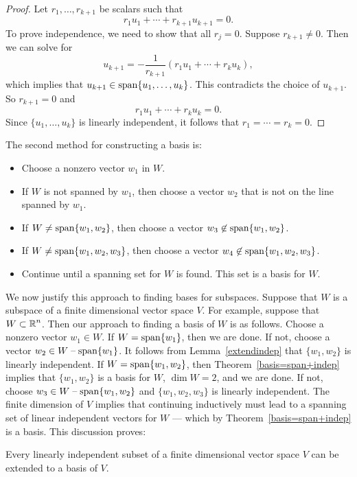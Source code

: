 \documentclass{ximera}
\begin{document}
\begin{proof}  Let $r_1,\ldots,r_{k+1}$ be scalars such that
\begin{equation}  \label{rk+1}
r_1u_1 + \cdots + r_{k+1}u_{k+1} = 0.
\end{equation}
To prove independence, we need to show that all $r_j=0$.
Suppose $r_{k+1}\neq 0$.  Then we can solve  for
\[
u_{k+1} = -\frac{1}{r_{k+1}}(r_1u_1+\cdots +r_ku_k),
\]
which implies that $u_{k+1}\in {\rm span}\{u_1,\ldots,u_k\}$.  This
contradicts the choice of $u_{k+1}$.  So $r_{k+1}=0$ and
\[
r_1u_1 + \cdots + r_ku_k = 0.
\]
Since $\{u_1,\ldots,u_k\}$ is linearly independent, it follows
that $r_1=\cdots =r_k=0$.  \end{proof}

The second method for constructing a basis is:
\begin{itemize}
\item        Choose a nonzero vector $w_1$ in $W$.
\item If $W$ is not spanned by $w_1$, then choose a vector $w_2$
that is not on the line spanned by $w_1$.
\item        If $W\neq{\rm span}\{w_1,w_2\}$, then choose a vector
$w_3\not\in
{\rm span}\{w_1,w_2\}$.
\item        If $W\neq{\rm span}\{w_1,w_2,w_3\}$, then choose a vector
$w_4\not\in
{\rm span}\{w_1,w_2,w_3\}$.
\item Continue until a spanning set for $W$ is
found.  This set is a basis for $W$.
\end{itemize}

We now justify this approach to finding bases for subspaces.
Suppose that $W$ is a subspace of a finite dimensional vector
space $V$.  For example, suppose that $W\subset\mbox{$\Bbb{R}$}^n$. Then
our approach to finding a basis of $W$ is as follows.  Choose a
nonzero vector $w_1\in W$.  If $W={\rm span}\{w_1\}$, then we are
done.  If not, choose a vector $w_2\in W\;\mbox{--}\;{\rm span}\{w_1\}$.
It follows from Lemma~\ref{extendindep} that $\{w_1,w_2\}$ is
linearly independent.  If $W={\rm span}\{w_1,w_2\}$, then
Theorem~\ref{basis=span+indep} implies that $\{w_1,w_2\}$ is
a basis for $W$, $\dim W=2$, and we are done.  If not, choose
$w_3\in W\;\mbox{--}\;{\rm span}\{w_1,w_2\}$ and $\{w_1,w_2,w_3\}$ is
linearly independent.  The finite dimension of $V$ implies that
continuing inductively must lead to a spanning set of linear
independent vectors for $W$ --- which by
Theorem~\ref{basis=span+indep} is a basis. This discussion proves:
\begin{corollary}  \label{c:extendindependent}
Every linearly independent subset of a finite dimensional vector
space $V$ can be extended to a basis of $V$.
\end{corollary}
\end{document}
